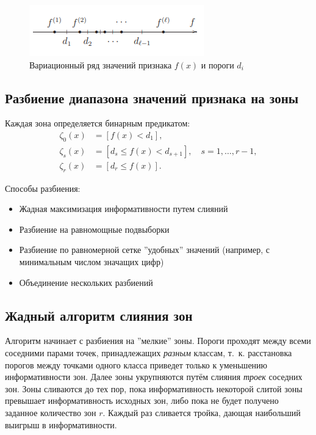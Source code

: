 \begin{figure}
    \centering
    \includegraphics[scale = 1]{chapters/logical/images/bin1.png}
    \caption{Вариационный ряд значений признака $f(x)$ и пороги $d_i$}
\end{figure}

\subsection{Разбиение диапазона значений признака на зоны}

Каждая зона определяется бинарным предикатом:
\begin{align*}
\zeta_0(x) &= [f(x) < d_1], \\
\zeta_s(x) &= [d_s \leq f(x) < d_{s+1}], \quad s = 1, \dots, r-1, \\
\zeta_r(x) &= [d_r \leq f(x)].
\end{align*}

Способы разбиения:
\begin{itemize}
    \item Жадная максимизация информативности путем слияний
    \item Разбиение на равномощные подвыборки
    \item Разбиение по равномерной сетке ''удобных'' значений (например, с минимальным числом значащих цифр)
    \item Объединение нескольких разбиений
\end{itemize}

\subsection{Жадный алгоритм слияния зон}

Алгоритм начинает с разбиения на ''мелкие'' зоны. Пороги проходят между всеми соседними парами точек, принадлежащих \emph{разным} классам, т.~к. расстановка порогов между точками одного класса приведет только к уменьшению информативности зон. Далее зоны укрупняются путём слияния \emph{троек} соседних зон. Зоны сливаются до тех пор, пока
информативность некоторой слитой зоны превышает информативность
исходных зон, либо пока не будет получено заданное количество зон $r$. Каждый раз сливается тройка, дающая наибольший выигрыш в информативности.

